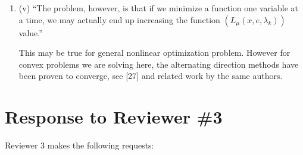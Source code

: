 \documentclass[11pt]{article}
\begin{document}
\begin{enumerate}
\item (v) ``The problem, however, is that if we minimize a function one variable at
a time, we may actually end up increasing the function $(L_{\mu}(x,e,\lambda_{k}))$ value.''

This may be true for general nonlinear optimization problem. However for convex problems
we are solving here, the alternating direction methods have been proven to converge, see
[27] and related work by the same authors.


\end{enumerate}

\section{Response to Reviewer \#3}
Reviewer 3 makes the following requests:
\end{document}
